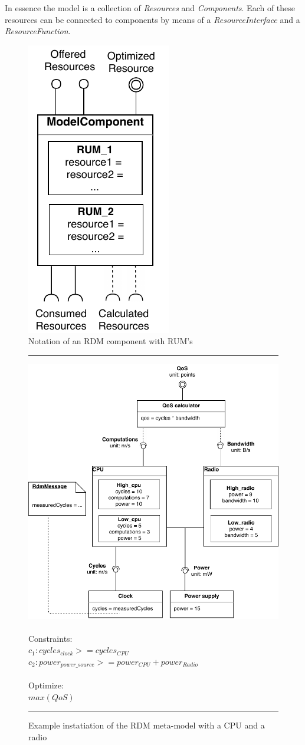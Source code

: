 In essence the model is a collection of \emph{Resources} and \emph{Components}. Each of these resources can be connected to components by means of a \emph{ResourceInterface} and a \emph{ResourceFunction}. 
\begin{figure}
\centering
  \includegraphics[width=0.3\linewidth]{resources/img/component.pdf}
  \caption{Notation of an RDM component with RUM's}
  \label{fig:component}
\end{figure}
\begin{figure}
\hrule
\begingroup\centering
  \includegraphics[width=\linewidth]{resources/img/rdm_cpu_radio.pdf}\endgroup \\ \\
  \noindent Constraints: \\
$c_1: cycles_{clock} >= cycles_{CPU}$ \\
$c_2: power_{power\_source} >= power_{CPU}+power_{Radio} $ \\ \\
\noindent Optimize:\\$max(QoS)$\\
\hrule
\caption{Example instatiation of the RDM meta-model with a CPU and a radio}
  \label{fig:rdm_cpu_radio}
\end{figure}

